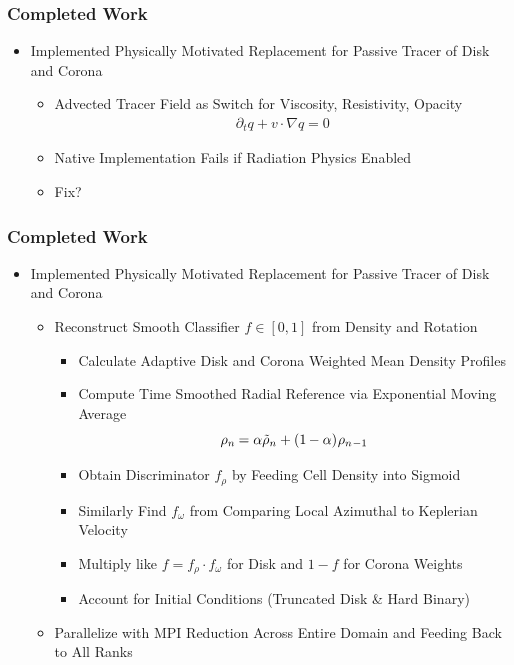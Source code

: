 	\begin{frame}[noframenumbering]
		\frametitle{Completed Work}
		\begin{itemize}
			\item<2-> Implemented Physically Motivated Replacement for Passive Tracer of Disk and Corona
			\begin{itemize}
				\item<3-> Advected Tracer Field as Switch for Viscosity, Resistivity, Opacity
						  \begin{align*}\partial_t q + v \cdot \nabla q = 0\end{align*}
				\item<4-> Native Implementation Fails if Radiation Physics Enabled
				\item<5-> Fix?
			\end{itemize}
		\end{itemize}
		\vspace{15.1ex}
	\end{frame}

	\begin{frame}[noframenumbering]
		\frametitle{Completed Work}
		\begin{itemize}
			\item<1-> Implemented Physically Motivated Replacement for Passive Tracer of Disk and Corona
			\begin{itemize}
				\item<2-> Reconstruct Smooth Classifier $f \in [0,1]$ from Density and Rotation
				\begin{itemize}
					\item<3-> Calculate Adaptive Disk and Corona Weighted Mean Density Profiles
					\item<4-> Compute Time Smoothed Radial Reference via Exponential Moving Average
							  $$\rho_n \kern-0.5pt = \alpha \tilde{\rho}_n + (1 \kern-0.5pt - \alpha) \kern+0.5pt \rho_{n\kern+0.5pt-1}$$
					\item<5-> Obtain Discriminator $f_\rho$ by Feeding Cell Density into Sigmoid
					\item<6-> Similarly Find $f_\omega$ from Comparing Local Azimuthal to Keplerian Velocity
					\item<7-> Multiply like $f = f_\rho \cdot f_\omega$ for Disk and $1 - f$ for Corona Weights
					\item<8-> Account for Initial Conditions (Truncated Disk \& Hard Binary)
				\end{itemize}
				\item<9-> Parallelize with MPI Reduction Across Entire Domain and Feeding Back to All Ranks
			\end{itemize}
		\end{itemize}
	\end{frame}

